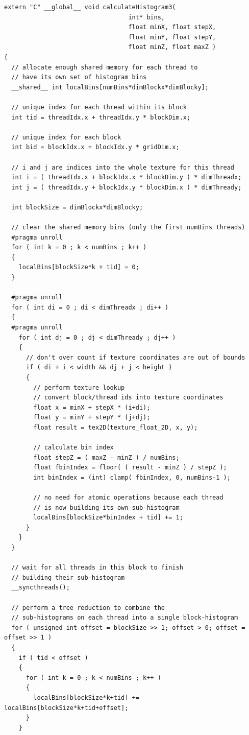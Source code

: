 \documentclass{article}
\begin{document}
\lstset{language=C,basicstyle=\footnotesize}
\begin{lstlisting}[caption={calculateHistogram3: Per-Thread Sub-Histograms},label={kernel3}]
extern "C" __global__ void calculateHistogram3(
                                  int* bins,
                                  float minX, float stepX,
                                  float minY, float stepY,
                                  float minZ, float maxZ )
{
  // allocate enough shared memory for each thread to
  // have its own set of histogram bins
  __shared__ int localBins[numBins*dimBlockx*dimBlocky];

  // unique index for each thread within its block
  int tid = threadIdx.x + threadIdx.y * blockDim.x;

  // unique index for each block
  int bid = blockIdx.x + blockIdx.y * gridDim.x;

  // i and j are indices into the whole texture for this thread
  int i = ( threadIdx.x + blockIdx.x * blockDim.y ) * dimThreadx;
  int j = ( threadIdx.y + blockIdx.y * blockDim.x ) * dimThready;

  int blockSize = dimBlockx*dimBlocky;

  // clear the shared memory bins (only the first numBins threads)
  #pragma unroll
  for ( int k = 0 ; k < numBins ; k++ ) 
  {
    localBins[blockSize*k + tid] = 0;
  }

  #pragma unroll
  for ( int di = 0 ; di < dimThreadx ; di++ )
  {
  #pragma unroll
    for ( int dj = 0 ; dj < dimThready ; dj++ )
    {
      // don't over count if texture coordinates are out of bounds
      if ( di + i < width && dj + j < height )
      {
        // perform texture lookup
        // convert block/thread ids into texture coordinates
        float x = minX + stepX * (i+di);
        float y = minY + stepY * (j+dj);
        float result = tex2D(texture_float_2D, x, y);

        // calculate bin index
        float stepZ = ( maxZ - minZ ) / numBins;
        float fbinIndex = floor( ( result - minZ ) / stepZ );
        int binIndex = (int) clamp( fbinIndex, 0, numBins-1 );

        // no need for atomic operations because each thread
        // is now building its own sub-histogram
        localBins[blockSize*binIndex + tid] += 1;
      }
    }
  }

  // wait for all threads in this block to finish
  // building their sub-histogram
  __syncthreads();

  // perform a tree reduction to combine the
  // sub-histograms on each thread into a single block-histogram
  for ( unsigned int offset = blockSize >> 1; offset > 0; offset = offset >> 1 )
  {
    if ( tid < offset )
    {
      for ( int k = 0 ; k < numBins ; k++ )
      {
        localBins[blockSize*k+tid] += localBins[blockSize*k+tid+offset];
      }
    }


\end{lstlisting}
\end{document}
